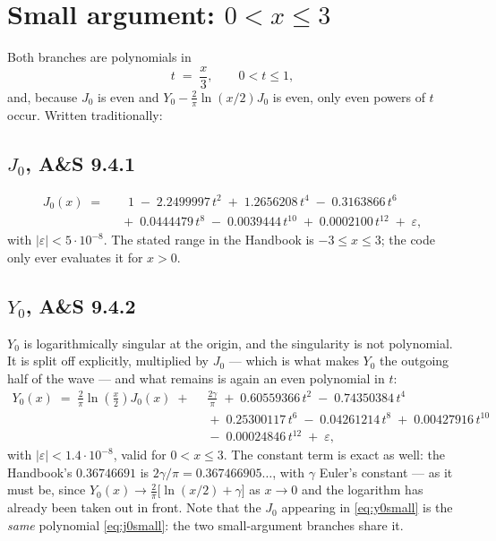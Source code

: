 \documentclass[11pt,a4paper]{article}
\begin{document}
\section{Small argument: $0 < x \le 3$}

Both branches are polynomials in
%
\begin{equation}
  t \;=\; \frac{x}{3}, \qquad 0 < t \le 1 ,
\end{equation}
%
and, because $J_0$ is even and $Y_0-\tfrac{2}{\pi}\ln(x/2)J_0$ is even, only
even powers of $t$ occur. Written traditionally:

\subsection*{$J_0$, A\&S 9.4.1}

\begin{equation}
\begin{aligned}
  J_0(x) \;=\;
      &\;\;\;1
      \;-\; 2.2499997\,t^{2}
      \;+\; 1.2656208\,t^{4}
      \;-\; 0.3163866\,t^{6}\\
      &\;+\; 0.0444479\,t^{8}
      \;-\; 0.0039444\,t^{10}
      \;+\; 0.0002100\,t^{12}
      \;+\; \varepsilon ,
\end{aligned}
\label{eq:j0small}
\end{equation}
%
with $|\varepsilon| < 5\cdot10^{-8}$. The stated range in the Handbook is
$-3\le x\le 3$; the code only ever evaluates it for $x>0$.

\subsection*{$Y_0$, A\&S 9.4.2}

$Y_0$ is logarithmically singular at the origin, and the singularity is not
polynomial. It is split off explicitly, multiplied by $J_0$ --- which is what
makes $Y_0$ the outgoing half of the wave --- and what remains is again an
even polynomial in $t$:
%
\begin{equation}
\begin{aligned}
  Y_0(x) \;=\; \frac{2}{\pi}\ln\!\left(\frac{x}{2}\right) J_0(x)
      \;+\;&\; \frac{2\gamma}{\pi}
      \;+\; 0.60559366\,t^{2}
      \;-\; 0.74350384\,t^{4}\\
      &\;+\; 0.25300117\,t^{6}
      \;-\; 0.04261214\,t^{8}
      \;+\; 0.00427916\,t^{10}\\
      &\;-\; 0.00024846\,t^{12}
      \;+\; \varepsilon ,
\end{aligned}
\label{eq:y0small}
\end{equation}
%
with $|\varepsilon| < 1.4\cdot10^{-8}$, valid for $0 < x \le 3$. The constant
term is exact as well: the Handbook's $0.36746691$ is $2\gamma/\pi =
0.367466905\ldots$, with $\gamma$ Euler's constant --- as it must be, since
$Y_0(x) \to \tfrac{2}{\pi}\big[\ln(x/2)+\gamma\big]$ as $x\to0$ and the
logarithm has already been taken out in front. Note that the $J_0$ appearing
in \eqref{eq:y0small} is the \emph{same} polynomial \eqref{eq:j0small}: the two
small-argument branches share it.
\end{document}
